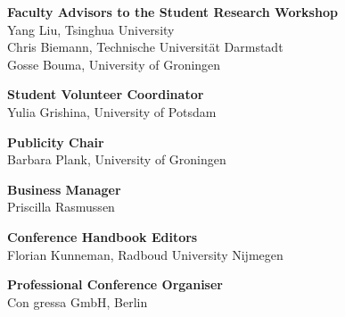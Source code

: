 {\bf Faculty Advisors to the Student Research Workshop} \\
Yang Liu, Tsinghua University \\
Chris Biemann, Technische Universität Darmstadt \\
Gosse Bouma, University of Groningen 

{\bf Student Volunteer Coordinator} \\
Yulia Grishina, University of Potsdam

{\bf Publicity Chair} \\
Barbara Plank, University of Groningen

{\bf Business Manager} \\
Priscilla Rasmussen

{\bf Conference Handbook Editors} \\
Florian Kunneman, Radboud University Nijmegen

{\bf Professional Conference Organiser} \\
Con gressa GmbH, Berlin
